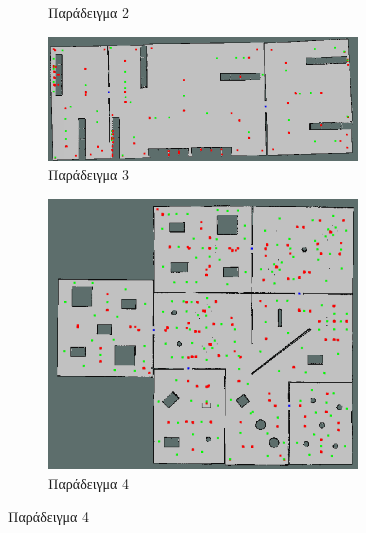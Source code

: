 \begin{figure}[!htb]
\begin{subfigure}{0.5\textwidth}
        \caption{Παράδειγμα 2}
        \label{fig:room_detection_example_2}
    \end{subfigure}
    \begin{subfigure}{0.5\textwidth}
        \includegraphics[width=0.9\textwidth]{./images/chapter6/warehouse_2.png}
        \caption{Παράδειγμα 3}
        \label{fig:room_detection_example_3}
    \end{subfigure}%
    \begin{subfigure}{0.5\textwidth}
        \centering
        \includegraphics[width=0.9\textwidth]{./images/chapter6/indoor_with_distance_features.png}
        \caption{Παράδειγμα 4}
        \label{fig:room_detection_example_4}
    \end{subfigure}
\end{figure}






